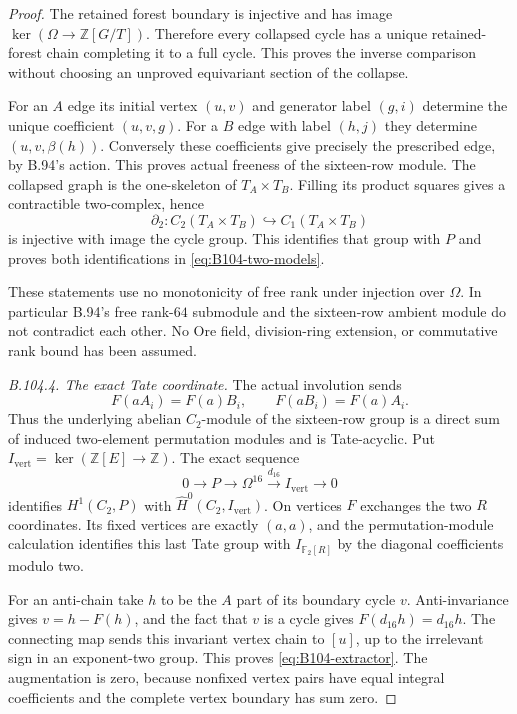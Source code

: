 \begin{proof}
The retained forest boundary is injective and has image
$\ker(\Omega\to\mathbb Z[G/T])$. Therefore every collapsed cycle
has a unique retained-forest chain completing it to a full cycle.
This proves the inverse comparison without choosing an unproved
equivariant section of the collapse.

For an $A$ edge its initial vertex $(u,v)$ and generator label
$(g,i)$ determine the unique coefficient $(u,v,g)$.
For a $B$ edge with label $(h,j)$ they determine
$(u,v,\beta(h))$. Conversely these coefficients give precisely
the prescribed edge, by B.94's action. This proves actual freeness
of the sixteen-row module. The collapsed graph is the one-skeleton
of $T_A\times T_B$. Filling its product squares gives a contractible
two-complex, hence
\[
 \partial_2:C_2(T_A\times T_B)\hookrightarrow C_1(T_A\times T_B)
\]
is injective with image the cycle group. This identifies that group
with $P$ and proves both identifications in
\eqref{eq:B104-two-models}.

These statements use no monotonicity of free rank under injection
over $\Omega$. In particular B.94's free rank-$64$ submodule and
the sixteen-row ambient module do not contradict each other.
No Ore field, division-ring extension, or commutative rank bound
has been assumed.

\emph{B.104.4. The exact Tate coordinate.}
The actual involution sends
\[
 F(a A_i)=F(a)B_i,\qquad F(a B_i)=F(a)A_i.
\]
Thus the underlying abelian $C_2$-module of the sixteen-row group
is a direct sum of induced two-element permutation modules and is
Tate-acyclic. Put $I_{\mathrm{vert}}=\ker(\mathbb Z[E]\to\mathbb Z)$.
The exact sequence
\[
 0\longrightarrow P\longrightarrow\Omega^{16}
       \xrightarrow{d_{16}}I_{\mathrm{vert}}\longrightarrow0
\]
identifies $H^1(C_2,P)$ with $\widehat H^0(C_2,I_{\mathrm{vert}})$.
On vertices $F$ exchanges the two $R$ coordinates. Its fixed
vertices are exactly $(a,a)$, and the permutation-module
calculation identifies this last Tate group with
$I_{\mathbb F_2[R]}$ by the diagonal coefficients modulo two.

For an anti-chain take $h$ to be the $A$ part of its boundary cycle
$v$. Anti-invariance gives $v=h-F(h)$, and the fact that $v$ is a
cycle gives $F(d_{16}h)=d_{16}h$. The connecting map sends this
invariant vertex chain to $[u]$, up to the irrelevant sign in an
exponent-two group. This proves \eqref{eq:B104-extractor}.
The augmentation is zero, because nonfixed vertex pairs have equal
integral coefficients and the complete vertex boundary has sum zero.


\end{proof}
